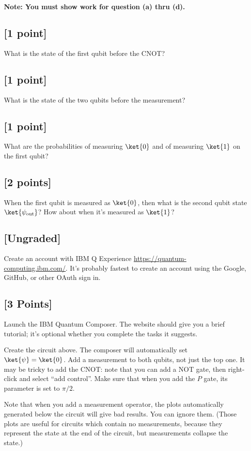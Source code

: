 \documentclass[11pt]{article}
\begin{document}
\noindent \textbf{Note: You must show work for question (a) thru (d).}

\subsection{[1 point]}
What is the state of the first qubit before the CNOT?

\subsection{[1 point]}
What is the state of the two qubits before the measurement?

\subsection{[1 point]}
What are the probabilities of measuring $\ket{0}$ and of measuring $\ket{1}$ on the first qubit?

\subsection{[2 points]}
When the first qubit is measured as $\ket{0}$, then what is the second qubit state $\ket{\psi_\text{out}}$? How about when it's measured as $\ket{1}$?



\subsection{[Ungraded]} Create an account with IBM Q Experience \url{https://quantum-computing.ibm.com/}.
It's probably fastest to create an account using the Google, GitHub, or other OAuth sign in.

\subsection{[3 Points]} Launch the IBM Quantum Composer.  The website should give you a brief tutorial; it's optional whether you complete the tasks it suggests. 

Create the circuit above.
The composer will automatically set $\ket{\psi}=\ket{0}$.
Add a measurement to both qubits, not just the top one.
It may be tricky to add the CNOT: note that you can add a NOT gate, then right-click and select ``add control''.
Make sure that when you add the $P$ gate, its parameter is set to $\pi/2$.

Note that when you add a measurement operator, the plots automatically generated below the circuit will give bad results. You can ignore them. (Those plots are useful for circuits which contain no measurements, because they represent the state at the end of the circuit, but measurements collapse the state.)
\end{document}
